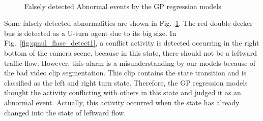 \begin{figure}[!htbp]
	\centering\
	\caption[Falsely detected Abnormal events by the GP regression models]{Falsely detected Abnormal events by the GP regression models}
	\label{fig:qmul_false_detected}
\end{figure}

Some falsely detected abnormalities are shown in Fig.~\ref{fig:qmul_false_detected}. The red double-decker bus is detected as a U-turn agent due to its big size. In Fig.~\ref{fig:qmul_flase_detect1}, a conflict activity is detected occurring in the right bottom of the camera scene, because in this state, there should not be a leftward traffic flow. However, this alarm is a misunderstanding by our models because of the bad video clip segmentation. This clip contains the state transition and is classified as the left and right turn state. 
Therefore, the GP regression models thought the activity conflicting with others in this state and judged it as an abnormal event. 
Actually, this activity occurred when the state has already changed into the state of leftward flow.

